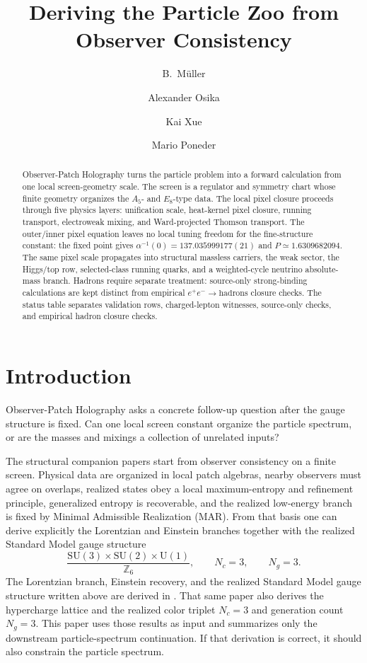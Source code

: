 \documentclass[11pt]{article}
\title{Deriving the Particle Zoo from\\
Observer Consistency}
\author{B.\ M\"uller \and Alexander Osika \and Kai Xue \and Mario Poneder}
\date{\OPHPaperReleaseDate}
\newcommand{\SU}{\mathrm{SU}}
\newcommand{\U}{\mathrm{U}}
\begin{document}
\maketitle
\OPHPaperReleaseBanner

\begin{abstract}
Observer-Patch Holography turns the particle problem into a forward calculation from one local screen-geometry scale. The screen is a regulator and symmetry chart whose finite geometry organizes the \(A_5\)- and \(E_8\)-type data. The local pixel closure proceeds through five physics layers: unification scale, heat-kernel pixel closure, running transport, electroweak mixing, and Ward-projected Thomson transport. The outer/inner pixel equation leaves no local tuning freedom for the fine-structure constant: the fixed point gives \(\alpha^{-1}(0)=137.035999177(21)\) and \(P\simeq1.6309682094\). The same pixel scale propagates into structural massless carriers, the weak sector, the Higgs/top row, selected-class running quarks, and a weighted-cycle neutrino absolute-mass branch. Hadrons require separate treatment: source-only strong-binding calculations are kept distinct from empirical \(e^+e^-\to\mathrm{hadrons}\) closure checks. The status table separates validation rows, charged-lepton witnesses, source-only checks, and empirical hadron closure checks.
\end{abstract}

\section{Introduction}

Observer-Patch Holography asks a concrete follow-up question after the gauge structure is fixed.
Can one local screen constant organize the particle spectrum, or are the masses and mixings a
collection of unrelated inputs?

The structural companion papers start from observer consistency on a finite screen. Physical data are organized in local patch algebras, nearby observers must agree on overlaps, realized states obey a local maximum-entropy and refinement principle, generalized entropy is recoverable, and the realized low-energy branch is fixed by Minimal Admissible Realization (MAR). From that basis one can derive explicitly the Lorentzian and Einstein branches together with the realized Standard Model gauge structure
\[
\frac{\SU(3)\times\SU(2)\times\U(1)}{\mathbb Z_6},
\qquad
N_c=3,
\qquad
N_g=3.
\]
The Lorentzian branch, Einstein recovery, and the realized Standard Model gauge structure written
above are derived in \cite{ophcompact}. That same paper also derives the hypercharge lattice and
the realized color triplet \(N_c=3\) and generation count \(N_g=3\). This paper uses those results as input and summarizes only the
downstream particle-spectrum continuation. If that derivation is correct, it should also constrain the particle spectrum.
\end{document}
